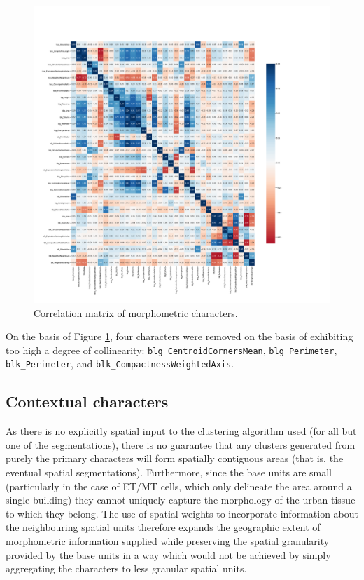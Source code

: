 \documentclass[a4paper, nobind]{templates/ociamthesis}
\begin{document}
\begin{figure}

{\centering \includegraphics[width=1\linewidth]{figures/ET_correlations} 

}

\caption{Correlation matrix of morphometric characters.}\label{fig:correlation-matrix}
\end{figure}

On the basis of Figure \ref{fig:correlation-matrix}, four characters were removed on the basis of exhibiting too high a degree of collinearity: \texttt{blg\_CentroidCornersMean}, \texttt{blg\_Perimeter}, \texttt{blk\_Perimeter}, and \texttt{blk\_CompactnessWeightedAxis}.

\hypertarget{contextual-characters}{%
\subsection{Contextual characters}\label{contextual-characters}}

As there is no explicitly spatial input to the clustering algorithm used (for all but one of the segmentations), there is no guarantee that any clusters generated from purely the primary characters will form spatially contiguous areas (that is, the eventual spatial segmentations). Furthermore, since the base units are small (particularly in the case of ET/MT cells, which only delineate the area around a single building) they cannot uniquely capture the morphology of the urban tissue to which they belong. The use of spatial weights to incorporate information about the neighbouring spatial units therefore expands the geographic extent of morphometric information supplied while preserving the spatial granularity provided by the base units in a way which would not be achieved by simply aggregating the characters to less granular spatial units.
\end{document}
